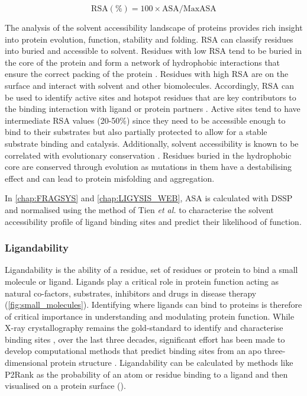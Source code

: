 \begin{equation}
\text{RSA} (\%) = 100 \times \text{ASA}/\text{MaxASA}
\label{eq:RSA}
\end{equation}

\vspace{-13pt} %

The analysis of the solvent accessibility landscape of proteins provides rich insight into protein evolution, function, stability and folding. RSA can classify residues into buried and accessible to solvent. Residues with low RSA tend to be buried in the core of the protein and form a network of hydrophobic interactions that ensure the correct packing of the protein \cite{DILL_1990_FOLDING}. Residues with high RSA are on the surface and interact with solvent and other biomolecules. Accordingly, RSA can be used to identify active sites and hotspot residues that are key contributors to the binding interaction with ligand or protein partners \cite{JONES_1997_PROTINTERS}. Active sites tend to have intermediate RSA values (20-50\%) since they need to be accessible enough to bind to their substrates but also partially protected to allow for a stable substrate binding and catalysis. Additionally, solvent accessibility is known to be correlated with evolutionary conservation \cite{GOLDMAN_1998_SS_RSA_EVO}. Residues buried in the hydrophobic core are conserved through evolution as mutations in them have a destabilising effect and can lead to protein misfolding and aggregation.

In \autoref{chap:FRAGSYS} and \autoref{chap:LIGYSIS_WEB}, ASA is calculated with DSSP \cite{KABSCH_1983_DSSP} and normalised using the method of Tien \textit{et al.} \cite{TIEN_2013_RSA} to characterise the solvent accessibility profile of ligand binding sites and predict their likelihood of function.

\subsubsection{Ligandability}

Ligandability is the ability of a residue, set of residues or protein to bind a small molecule or ligand. Ligands play a critical role in protein function acting as natural co-factors, substrates, inhibitors and drugs in disease therapy (\autoref{fig:small_molecules}). Identifying where ligands can bind to proteins is therefore of critical importance in understanding and modulating protein function. While X-ray crystallography remains the gold-standard to identify and characterise binding sites \cite{CONGREVE_2003_RO3, REES_2004_FBLD, MURRAY_2009_FBDD, SCHIEBEL_2016_FRAGMENTS}, over the last three decades, significant effort has been made to develop computational methods that predict binding sites from an apo three-dimensional protein structure \cite{VOLKAMER_2010_TOPOLOGY}. Ligandability can be calculated by methods like P2Rank \cite{KRIVAK_2018_P2RANK} as the probability of an atom or residue binding to a ligand and then visualised on a protein surface ().

